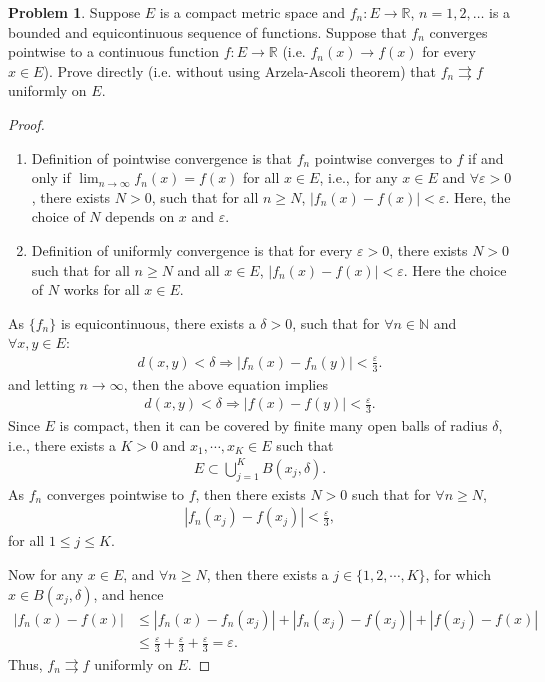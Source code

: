 \documentclass[11pt]{article}
\theoremstyle{definition}
\newtheorem{problem}{Problem}
\theoremstyle{definition}
\begin{document}
\begin{problem}
Suppose $E$ is a compact metric space and $f_n:E\to\mathbb{R}$,
$n=1,2,\ldots$ is a bounded and equicontinuous sequence of functions. Suppose that $f_n$ converges pointwise to a continuous
function $f:E\to\mathbb{R}$ (i.e. $f_n(x)\to f(x)$ for every $x\in E$). Prove directly (i.e. without using Arzela-Ascoli theorem)
that $f_n\rightrightarrows f$ uniformly on $E$.
\end{problem}
\begin{proof}
~\begin{enumerate}[label=(\alph*)]
    \item Definition of pointwise convergence is that $f_n$ pointwise converges to $f$ if and only if $\lim_{n\to \infty}f_n(x) = f(x)$ for all $x\in E$, i.e., for any $x\in E$ and $\forall \varepsilon > 0$, there exists $N > 0$, such that for all $n \geq N$, $|f_n(x) - f(x)| < \varepsilon$. Here, the choice of $N$ depends on $x$ and $\varepsilon$.
    \item Definition of uniformly convergence is that for every $\varepsilon > 0$, there exists $N > 0$ such that for all $n\geq N$ and all $x\in E$, $|f_n(x) - f(x)| < \varepsilon$. Here the choice of $N$ works for all $x \in E$.
\end{enumerate}

As $\{f_n\}$ is equicontinuous, there exists a $\delta > 0$, such that for $\forall n \in\mathbb{N}$ and $\forall x,y\in E$:
\begin{align*}
    d(x,y) < \delta \Longrightarrow |f_n(x) - f_n(y)| < \frac{\varepsilon}{3}.
\end{align*}
and letting $n\to \infty$, then the above equation implies
\begin{align*}
    d(x,y) < \delta \Longrightarrow |f(x) - f(y)| < \frac{\varepsilon}{3}.
\end{align*}
Since $E$ is compact, then it can be covered by finite many open balls of radius $\delta$, i.e., there exists a $K > 0$ and $x_1, \cdots, x_K \in E$ such that 
\begin{align*}
    E \subset \bigcup^K_{j=1} B\left(x_j, \delta\right).
\end{align*}
As $f_n$ converges pointwise to $f$, then there exists $N > 0$ such that for $\forall n \geq N$, 
\begin{align*}
    |f_n(x_j) - f(x_j)| < \frac{\varepsilon}{3},
\end{align*}
for all $1\leq j \leq K$.

Now for any $x\in E$, and $\forall n \geq N$, then there exists a $j\in \{1,2,\cdots,K\}$, for which $x\in B(x_j,\delta)$, and hence
\begin{align*}
    |f_n(x) - f(x)| & \leq |f_n(x) - f_n(x_j)| + |f_n(x_j) - f(x_j)| + |f(x_j) - f(x)| \\
    & \leq \frac{\varepsilon}{3} + \frac{\varepsilon}{3} + \frac{\varepsilon}{3} = \varepsilon.
\end{align*}
Thus, $f_n\rightrightarrows f$ uniformly on $E$.
\end{proof}
\end{document}
